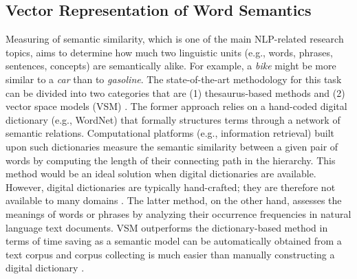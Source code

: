 \documentclass[Journal, BackFigs, DoubleSpace]{ascelike}%
\begin{document}
\subsection{Vector Representation of Word Semantics}
Measuring of semantic similarity, which is one of the main NLP-related research topics, aims to determine how much two linguistic units (e.g., words, phrases, sentences, concepts) are semantically alike. For example, a \textit{bike} might be more similar to a \textit{car} than to \textit{gasoline}. The state-of-the-art methodology for this task can be divided into two categories that are (1) thesaurus-based methods and (2) vector space models (VSM) \cite{harispe13}. The former approach relies on a hand-coded digital dictionary (e.g., WordNet) that formally structures terms through a network of semantic relations. Computational platforms (e.g., information retrieval) built upon such dictionaries measure the semantic similarity between a given pair of words by computing the length of their connecting path in the hierarchy. This method would be an ideal solution when digital dictionaries are available. However, digital dictionaries are typically hand-crafted; they are therefore not available to many domains \cite{kolb08}. The latter method, on the other hand, assesses the meanings of words or phrases by analyzing their occurrence frequencies in natural language text documents. VSM outperforms the dictionary-based method in terms of time saving as a semantic model can be automatically obtained from a text corpus and corpus collecting is much easier than manually constructing a digital dictionary \cite{turney10}.
\par
\end{document}
